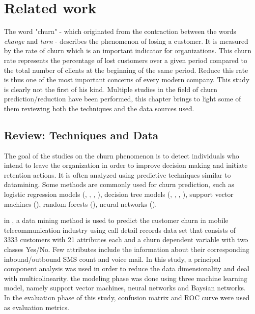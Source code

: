\documentclass[LaM,binding=0.6cm, english]{sapthesis}
\begin{document}
\chapter{Related work}

The word "churn" - which originated from the contraction between the words \textit{change} and \textit{turn} - describes the phenomenon of losing a customer. It is measured by the rate of churn which is an important indicator for organizations. This churn rate represents the percentage of lost customers over a given period compared to the
total number of clients at the beginning of the same period. Reduce this rate is thus one of the most important concerns of every modern company. This study is clearly not the first of his kind. Multiple studies in the field of churn prediction/reduction have been performed, this chapter brings to light some of them reviewing both the techniques and the data sources used.

\section{Review: Techniques and Data}

The goal of the studies on the churn phenomenon is to detect individuals who intend to leave the organization in order to improve decision making and initiate retention actions. It is often analyzed using predictive techniques similar to datamining. Some methods are commonly used for churn prediction, such as logistic regression models (\cite{Nie2009}, \cite{Dahiya2015}, \cite{Yabas2013}, \cite{Rehman2013}), decision tree models (\cite{Dahiya2015}, \cite{Yabas2013}, \cite{Yabas2013}, \cite{Rehman2013}), support vector machines (\cite{Toderean2016}), random forests (\cite{Yabas2013}), neural networks (\cite{Rehman2013}).

\par in \cite{Toderean2016}, a data mining method is used to predict the customer churn in mobile telecommunication industry using call detail records data set that consists of 3333 customers with 21 attributes each and a churn dependent variable with two classes Yes/No. Few attributes include the information about their corresponding inbound/outbound SMS count and voice mail. In this study, a principal component analysis was used in order to reduce the data dimensionality and deal with multicolinearity. the modeling phase was done using three machine learning model, namely support vector machines, neural networks and Baysian networks. In the evaluation phase of this study, confusion matrix and ROC curve were used as evaluation metrics.
\end{document}
